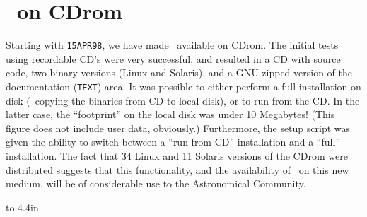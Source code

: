 \section{\AIPS\ on CDrom}

Starting with {\tt 15APR98}, we have made \AIPS\ available on CDrom.
The initial tests using recordable CD's were very successful, and
resulted in a CD with source code, two binary versions (Linux and
Solaris), and a GNU-zipped version of the documentation ({\tt TEXT})
area.  It was possible to either perform a full installation on disk
(\ie\ copying the binaries from CD to local disk), or to run from the
\hbox{CD}.  In the latter case, the ``footprint'' on the local disk
was under 10 Megabytes!  (This figure does not include user data,
obviously.)  Furthermore, the setup script was given the ability to
switch between a ``run from CD'' installation and a ``full''
installation.  The fact that 34 Linux and 11 Solaris versions of the
CDrom were distributed suggests that this functionality, and the
availability of \AIPS\ on this new medium, will be of considerable
use to the Astronomical Community.

\eject

 \cleardoublepage\pagestyle{empty}
 \centerline{\hss{}\hss}
 \vfill\eject
 \vbox to 4.4in{
 \vfill
 \vfill}
 \phantom{...}
 \centerline{\hss{}\hss}


